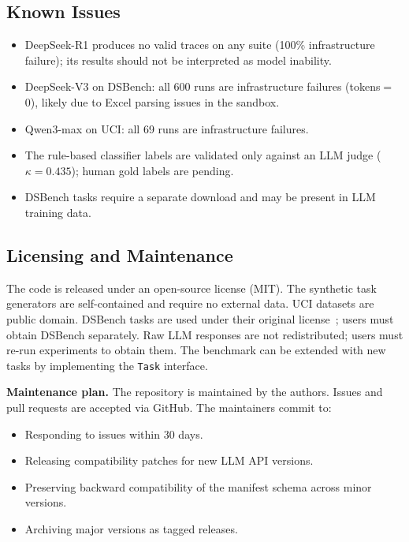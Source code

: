 \subsection{Known Issues}

\begin{itemize}[leftmargin=*,itemsep=1pt]
\item DeepSeek-R1 produces no valid traces on any suite (100\% infrastructure failure); its results should not be interpreted as model inability.
\item DeepSeek-V3 on DSBench: all 600 runs are infrastructure failures (tokens$=$0), likely due to Excel parsing issues in the sandbox.
\item Qwen3-max on UCI: all 69 runs are infrastructure failures.
\item The rule-based classifier labels are validated only against an LLM judge ($\kappa=0.435$); human gold labels are pending.
\item DSBench tasks require a separate download and may be present in LLM training data.
\end{itemize}

\subsection{Licensing and Maintenance}

The code is released under an open-source license (MIT). The synthetic task generators are self-contained and require no external data. UCI datasets are public domain. DSBench tasks are used under their original license~\citep{jing2024dsbench}; users must obtain DSBench separately. Raw LLM responses are not redistributed; users must re-run experiments to obtain them. The benchmark can be extended with new tasks by implementing the \texttt{Task} interface.

\textbf{Maintenance plan.} The repository is maintained by the authors. Issues and pull requests are accepted via GitHub. The maintainers commit to:
\begin{itemize}[leftmargin=*,itemsep=1pt]
\item Responding to issues within 30 days.
\item Releasing compatibility patches for new LLM API versions.
\item Preserving backward compatibility of the manifest schema across minor versions.
\item Archiving major versions as tagged releases.
\end{itemize}

